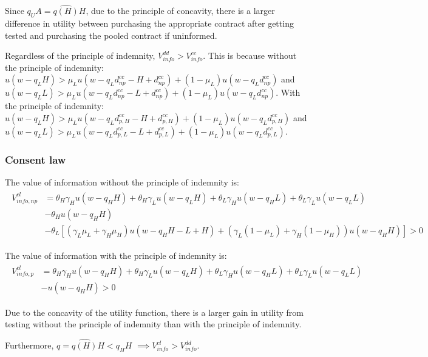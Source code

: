 \documentclass[nonatbib,preprint,12pt]{elsarticle}
\theoremstyle{plain}
\theoremstyle{definition}
\theoremstyle{plain}
\theoremstyle{TheoremNum}
\theoremstyle{CorollaryNum}
\theoremstyle{PropositionNum}
\theoremstyle{TheoremNum}
\begin{document}
Since $q_U A = \widehat{q(H)}H$, due to the principle of concavity, there is a larger difference in utility between purchasing the appropriate contract after getting tested and purchasing the pooled contract if uninformed.

Regardless of the principle of indemnity, $V_{info}^{dd} > V_{info}^{cc}$. This is because without the principle of indemnity: $u(w-q_L H) > \mu_L u(w-q_L d_{np}^{cc} - H + d_{np}^{cc}) + (1-\mu_L)u(w-q_L d_{np}^{cc})$ and $u(w-q_L L) > \mu_L u(w-q_L d_{np}^{cc} - L + d_{np}^{cc}) + (1-\mu_L)u(w-q_L d_{np}^{cc})$. With the principle of indemnity: $u(w-q_L H) > \mu_L u(w-q_L d_{p,H}^{cc} - H + d_{p,H}^{cc}) + (1-\mu_L)u(w-q_L d_{p,H}^{cc})$ and $u(w-q_L L) > \mu_L u(w-q_L d_{p,L}^{cc} - L + d_{p,L}^{cc}) + (1-\mu_L)u(w-q_L d_{p,L}^{cc})$.

\subsubsection*{Consent law}


The value of information without the principle of indemnity is:
\begin{align}
\begin{split}
    V_{info,np}^{cl} & = \theta_H \gamma_H u(w-q_H H) + \theta_H \gamma_L u(w-q_L H) + \theta_L \gamma_H u(w-q_H L) + \theta_L \gamma_L u(w-q_L L) \\
    & - \theta_H u(w- q_H H) \\
    & - \theta_L [(\gamma_L\mu_L+\gamma_H \mu_H) u(w-q_H H - L + H) + (\gamma_L(1-\mu_L) + \gamma_H(1-\mu_H))u(w-q_H H)] > 0
\end{split}
\end{align}

The value of information with the principle of indemnity is:
\begin{align}
\begin{split}
    V_{info,p}^{cl} & = \theta_H \gamma_H u(w-q_H H) + \theta_H \gamma_L u(w-q_L H) + \theta_L \gamma_H u(w-q_H L) + \theta_L \gamma_L u(w-q_L L) \\
    & - u(w-q_H H) > 0
\end{split}
\end{align}

Due to the concavity of the utility function, there is a larger gain in utility from testing without the principle of indemnity than with the principle of indemnity. 

Furthermore, $q = \widehat{q(H)}H < q_H H$ $\implies V_{info}^{cl} > V_{info}^{dd}$.
\end{document}
